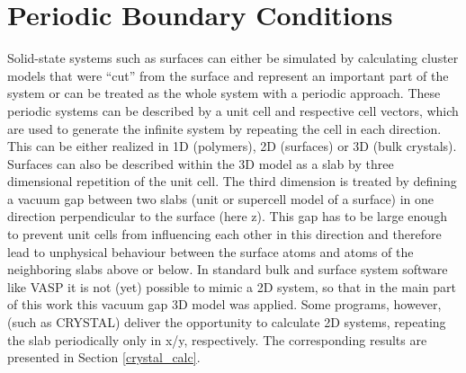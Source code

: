 \documentclass[11pt,DIV=13,BCOR=5mm,a4paper,headinclude]{scrbook}
\begin{document}
\section{Periodic Boundary Conditions}
Solid-state systems such as surfaces can either be simulated by calculating cluster models that were ``cut'' from the surface and represent an important part of the system or can be treated as the whole system with a periodic approach.
These periodic systems can be described by a unit cell and respective cell vectors, which are used to generate the infinite system by repeating the cell in each direction.
This can be either realized in 1D (polymers), 2D (surfaces) or 3D (bulk crystals).
Surfaces can also be described within the 3D model as a slab by three dimensional repetition of the unit cell.
The third dimension is treated by defining a vacuum gap between two slabs (unit or supercell model of a surface) in one direction perpendicular to the surface (here z).
This gap has to be large enough to prevent unit cells from influencing each other in this direction and therefore lead to unphysical behaviour between the surface atoms and atoms of the neighboring slabs above or below.
In standard bulk and surface system software like VASP\cite{kresse1993,kresse2,kresse3,kresse4,kresse99} it is not (yet) possible to mimic a 2D system, so that in the main part of this work this vacuum gap 3D model was applied.
Some programs, however, (such as CRYSTAL\cite{crystal14}) %
deliver the opportunity to calculate 2D systems, repeating the slab periodically only in x/y, respectively.
The corresponding results are presented in Section \ref{crystal_calc}.


\end{document}
